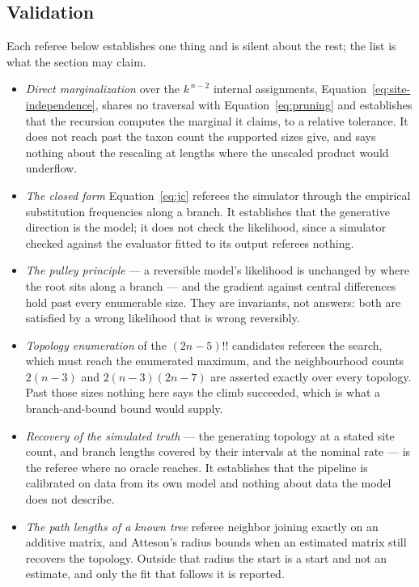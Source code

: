 \documentclass[11pt,a4paper]{article}
\begin{document}
\subsection{Validation}
\label{sec:phylo:validation}
Each referee below establishes one thing and is silent about the rest; the list
is what the section may claim.
\begin{itemize}
  \item \emph{Direct marginalization} over the $k^{\,n-2}$ internal
    assignments, Equation~\ref{eq:site-independence}, shares no traversal
    with Equation~\ref{eq:pruning} and establishes that the recursion computes
    the marginal it claims, to a relative tolerance. It does not reach past the
    taxon count the supported sizes give, and says nothing about the rescaling
    at lengths where the unscaled product would underflow.
  \item \emph{The closed form} Equation~\ref{eq:jc} referees the simulator
    through the empirical substitution frequencies along a branch. It
    establishes that the generative direction is the model; it does not check
    the likelihood, since a simulator checked against the evaluator fitted to
    its output referees nothing.
  \item \emph{The pulley principle} --- a reversible model's likelihood is
    unchanged by where the root sits along a branch --- and the gradient
    against central differences hold past every enumerable size. They are
    invariants, not answers: both are satisfied by a wrong likelihood that is
    wrong reversibly.
  \item \emph{Topology enumeration} of the $(2n-5)!!$ candidates referees the
    search, which must reach the enumerated maximum, and the neighbourhood
    counts $2(n-3)$ and $2(n-3)(2n-7)$ are asserted exactly over every
    topology. Past those sizes nothing here says the climb succeeded, which
    is what a branch-and-bound bound would supply.
  \item \emph{Recovery of the simulated truth} --- the generating topology at a
    stated site count, and branch lengths covered by their intervals at the
    nominal rate --- is the referee where no oracle reaches. It establishes
    that the pipeline is calibrated on data from its own model and nothing
    about data the model does not describe.
  \item \emph{The path lengths of a known tree} referee neighbor joining
    exactly on an additive matrix, and Atteson's radius bounds when an
    estimated matrix still recovers the topology. Outside that radius the
    start is a start and not an estimate, and only the fit that follows it is
    reported.
\end{itemize}
\end{document}
